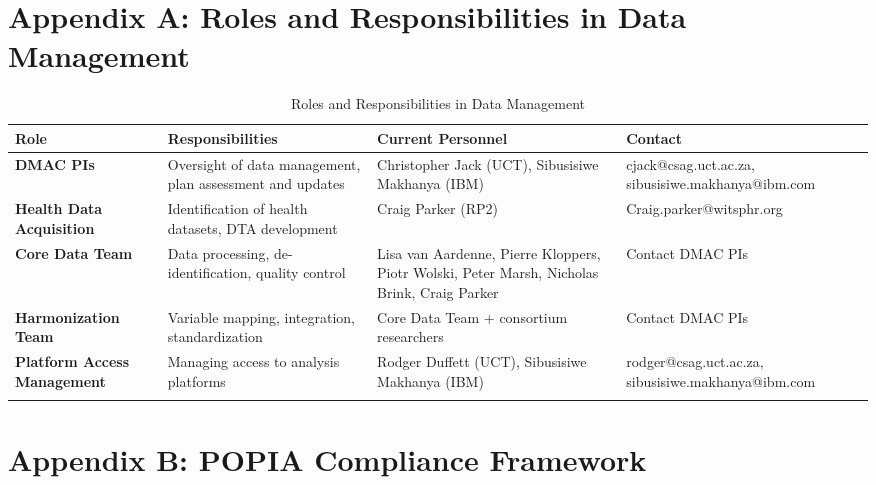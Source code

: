 \graphicspath{{./}{./sections/images/}{./images/}}\documentclass[12pt,a4paper,landscape]{article}
\begin{document}
\clearpage

\clearpage
\section*{Appendix A: Roles and Responsibilities in Data Management}

\begin{longtable}{L{3cm}L{6cm}L{5.5cm}L{5cm}}
\toprule
\textbf{Role} & \textbf{Responsibilities} & \textbf{Current Personnel} & \textbf{Contact} \\
\midrule
\endhead

\textbf{DMAC PIs} 
& Oversight of data management, plan assessment and updates 
& Christopher Jack (UCT), Sibusisiwe Makhanya (IBM) 
& cjack@csag.uct.ac.za, sibusisiwe.makhanya@ibm.com \\
\midrule

\textbf{Health Data Acquisition} 
& Identification of health datasets, DTA development 
& Craig Parker (RP2) 
& Craig.parker@witsphr.org \\
\midrule

\textbf{Core Data Team} 
& Data processing, de-identification, quality control 
& Lisa van Aardenne, Pierre Kloppers, Piotr Wolski, Peter Marsh, Nicholas Brink, Craig Parker 
& Contact DMAC PIs \\
\midrule

\textbf{Harmonization Team} 
& Variable mapping, integration, standardization 
& Core Data Team + consortium researchers 
& Contact DMAC PIs \\
\midrule

\textbf{Platform Access Management} 
& Managing access to analysis platforms 
& Rodger Duffett (UCT), Sibusisiwe Makhanya (IBM) 
& rodger@csag.uct.ac.za, sibusisiwe.makhanya@ibm.com \\
\bottomrule
\caption{Roles and Responsibilities in Data Management}
\end{longtable}

\clearpage
\section*{Appendix B: POPIA Compliance Framework}
\end{document}
